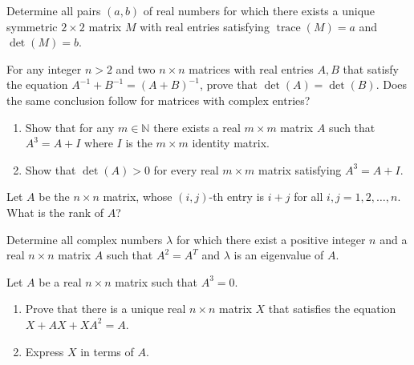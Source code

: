 \documentclass[12pt]{article}
\begin{document}
\begin{problem}
Determine all pairs $(a,b)$ of real numbers for which there exists a unique symmetric $2\times 2$ matrix $M$ with real entries satisfying $\operatorname{trace}(M)=a$ and $\det(M)=b$.
\end{problem}

\begin{problem}
For any integer $n>2$ and two $n\times n$ matrices with real entries $A,B$ that satisfy the equation $A^{-1}+B^{-1}=(A+B)^{-1}$, prove that $\det(A)=\det(B)$. Does the same conclusion follow for matrices with complex entries?
\end{problem}

\begin{problem}
\begin{enumerate}[label=(\alph*)]
\item Show that for any $m\in\mathbb{N}$ there exists a real $m\times m$ matrix $A$ such that $A^3=A+I$ where $I$ is the $m\times m$ identity matrix.
\item Show that $\det(A)>0$ for every real $m\times m$ matrix satisfying $A^3=A+I$.
\end{enumerate}
\end{problem}

\begin{problem}
Let $A$ be the $n\times n$ matrix, whose $(i,j)$-th entry is $i+j$ for all $i,j=1,2,\dots,n$. What is the rank of $A$?
\end{problem}

\begin{problem}
Determine all complex numbers $\lambda$ for which there exist a positive integer $n$ and a real $n\times n$ matrix $A$ such that $A^2=A^T$ and $\lambda$ is an eigenvalue of $A$.
\end{problem}

\begin{problem}
Let $A$ be a real $n\times n$ matrix such that $A^3=0$.
\begin{enumerate}[label=(\alph*)]
\item Prove that there is a unique real $n\times n$ matrix $X$ that satisfies the equation $X+AX+XA^2=A$.
\item Express $X$ in terms of $A$.
\end{enumerate}
\end{problem}
\end{document}
